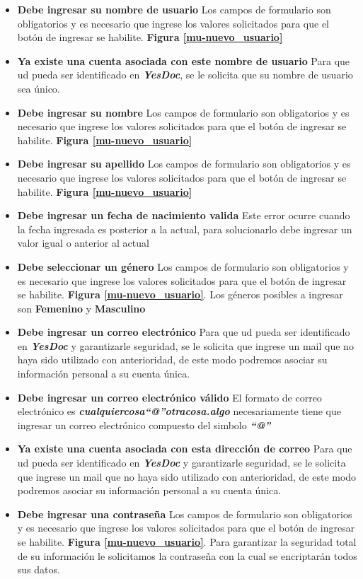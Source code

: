 \documentclass[a4paper,12pt]{article}
\begin{document}
\begin{itemize}
	\item \textbf{Debe ingresar su nombre de usuario}
	Los campos de formulario son obligatorios y es necesario que ingrese los valores solicitados para que el botón de ingresar se habilite.	\textbf{Figura \ref{mu-nuevo_usuario}}
	\item \textbf{Ya existe una cuenta asociada con este nombre de usuario}	
	Para que ud pueda ser identificado en \textbf{\textit{YesDoc}}, se le solicita que su nombre de usuario sea único.	
	\item \textbf{Debe ingresar su nombre}
	Los campos de formulario son obligatorios y es necesario que ingrese los valores solicitados para que el botón de ingresar se habilite.	\textbf{Figura \ref{mu-nuevo_usuario}}
	\item \textbf{Debe ingresar su apellido}
	Los campos de formulario son obligatorios y es necesario que ingrese los valores solicitados para que el botón de ingresar se habilite.	\textbf{Figura \ref{mu-nuevo_usuario}}
	\item \textbf{Debe ingresar un fecha de nacimiento valida}
Este error ocurre cuando la fecha ingresada es posterior a la actual, para solucionarlo debe ingresar un valor igual o anterior al actual
	\item \textbf{Debe seleccionar un género}
		Los campos de formulario son obligatorios y es necesario que ingrese los valores solicitados para que el botón de ingresar se habilite.	\textbf{Figura \ref{mu-nuevo_usuario}}. Los géneros posibles a ingresar son \textbf{Femenino} y \textbf{Masculino}
	\item \textbf{Debe ingresar un correo electrónico}
		Para que ud pueda ser identificado en \textbf{\textit{YesDoc}} y garantizarle seguridad, se le solicita que ingrese un mail que no haya sido utilizado con anterioridad, de este modo podremos asociar su información personal a su cuenta única.
	\item \textbf{Debe ingresar un correo electrónico válido}	
	El formato de correo electrónico  es \textbf{\textit{cualquiercosa``@''otracosa.algo}} necesariamente tiene que ingresar un correo electrónico compuesto del simbolo \textbf{\textit{``@''}}
	\item \textbf{Ya existe una cuenta asociada con esta dirección de correo}			
			Para que ud pueda ser identificado en \textbf{\textit{YesDoc}} y garantizarle seguridad, se le solicita que ingrese un mail que no haya sido utilizado con anterioridad, de este modo podremos asociar su información personal a su cuenta única.
	\item \textbf{Debe ingresar una contraseña}	
		Los campos de formulario son obligatorios y es necesario que ingrese los valores solicitados para que el botón de ingresar se habilite.	\textbf{Figura \ref{mu-nuevo_usuario}}. Para garantizar la seguridad total de su información le solicitamos la contraseña con la cual se encriptarán todos sus datos.
\end{itemize}
\end{document}
